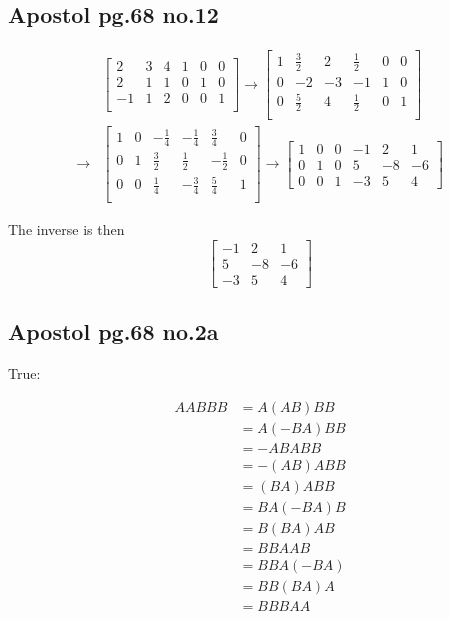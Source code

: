 \documentclass[12pt,letterpaper]{article}
\theoremstyle{definition}
\begin{document}
\subsection*{Apostol pg.68 no.12}

\begin{align*}
  & \begin{bmatrix}
    2 & 3 & 4 & 1 & 0 & 0 \\
    2 & 1 & 1 & 0 & 1 & 0 \\
    -1 & 1 & 2 & 0 & 0 & 1 \\
  \end{bmatrix} \rightarrow
  \begin{bmatrix}
    1 & \frac{3}{2} & 2 & \frac{1}{2} & 0 & 0\\
    0 & -2 & -3 & -1 & 1 & 0 \\
    0 & \frac{5}{2} & 4 & \frac{1}{2} & 0 & 1 \\
  \end{bmatrix} \\
  \rightarrow &
                \begin{bmatrix}
                  1 & 0 & -\frac{1}{4} & -\frac{1}{4} & \frac{3}{4} & 0 \\
                  0 & 1 & \frac{3}{2} & \frac{1}{2} & -\frac{1}{2} & 0 \\
                  0 & 0 & \frac{1}{4} & -\frac{3}{4} & \frac{5}{4} & 1 \\
                \end{bmatrix} \rightarrow
  \begin{bmatrix}
    1 & 0 & 0 & -1 & 2 & 1 \\
    0 & 1 & 0 & 5 & -8 & -6 \\
    0 & 0 & 1 & -3 & 5 & 4 
  \end{bmatrix}
\end{align*}

The inverse is then
\[
  \begin{bmatrix}
    -1 & 2 & 1 \\
     5 & -8 & -6 \\
     -3 & 5 & 4
  \end{bmatrix}
\]

\subsection*{Apostol pg.68 no.2a}

True:

\begin{align*}
  AABBB &= A(AB)BB \\
        &= A(-BA)BB \\
        &= -ABABB \\
        &= -(AB)ABB \\
        &= (BA)ABB \\
        &= BA(-BA)B \\
        &= B(BA)AB \\
        &= BBAAB \\
        &= BBA(-BA) \\
        &= BB(BA)A \\
        &= BBBAA
\end{align*}
\end{document}

